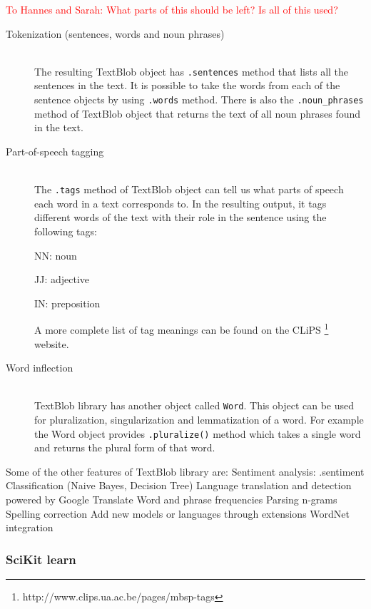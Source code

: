 \documentclass[a4paper]{article}
\begin{document}
\textcolor{red}{To Hannes and Sarah: What parts of this should be left? Is all of this used?}
\begin{description}
  \item[Tokenization (sentences, words and noun phrases)] \hfill \\
  The resulting TextBlob object has \texttt{.sentences} method that lists all the sentences in the text. It is possible to take the words from each of the sentence objects by using \texttt{.words} method. There is also the \texttt{.noun\_phrases} method of TextBlob object that returns the text of all noun phrases found in the text.
  
  \item[Part-of-speech tagging] \hfill \\
  The \texttt{.tags} method of TextBlob object can tell us what parts of speech each word in a text corresponds to. In the resulting output, it tags different words of the text with their role in the sentence using the following tags: 

  NN: noun

  JJ: adjective

  IN: preposition

  A more complete list of tag meanings can be found on the CLiPS  \footnote{http://www.clips.ua.ac.be/pages/mbsp-tags} website.
 
  \item[Word inflection] \hfill \\
  TextBlob library has another object called \texttt{Word}. This object can be used for pluralization, singularization and lemmatization of a word. For example the Word object provides \texttt{.pluralize()} method which takes a single word and returns the plural form of that word. 
 
\end{description}
Some of the other features of TextBlob library are:
Sentiment analysis: .sentiment
Classification (Naive Bayes, Decision Tree)
Language translation and detection powered by Google Translate
Word and phrase frequencies
Parsing
n-grams
Spelling correction
Add new models or languages through extensions
WordNet integration


\subsubsection{SciKit learn} 
\end{document}
